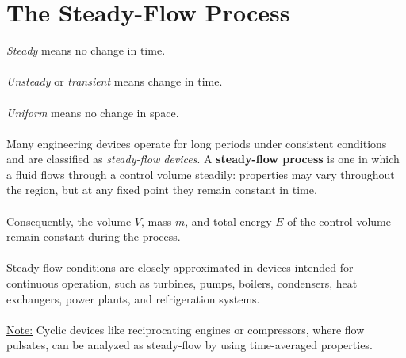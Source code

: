 \documentclass[12pt]{article}
\begin{document}
\section*{The Steady-Flow Process}
\textit{Steady} means no change in time.\\\\
\textit{Unsteady} or \textit{transient} means change in time.\\\\
\textit{Uniform} means no change in space.\\\\
Many engineering devices operate for long periods under consistent conditions and are classified as \textit{steady-flow devices}. 
A \textbf{steady-flow process} is one in which a fluid flows through a control volume steadily: properties may vary throughout the region, but at any fixed point they remain constant in time.\\\\
Consequently, the volume $V$, mass $m$, and total energy $E$ of the control volume remain constant during the process.\\\\
Steady-flow conditions are closely approximated in devices intended for continuous operation, such as turbines, pumps, boilers, condensers, heat exchangers, power plants, and refrigeration systems.\\\\
\underline{Note:} Cyclic devices like reciprocating engines or compressors, where flow pulsates, can be analyzed as steady-flow by using time-averaged properties.
\end{document}

